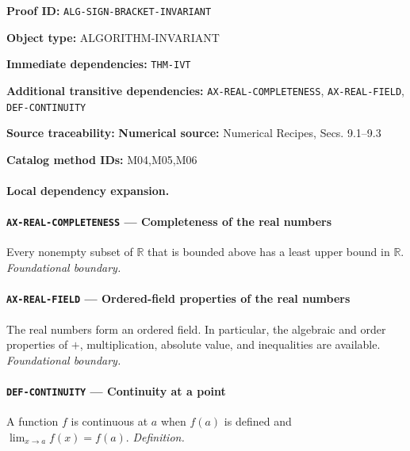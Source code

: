 \documentclass[10pt]{article}
\newcommand{\pidraw}[1]{\begingroup\urlstyle{tt}\nolinkurl{#1}\endgroup}
\theoremstyle{definition}
\theoremstyle{remark}
\newcommand{\meta}[2]{\noindent\textbf{#1:} #2\par}
\begin{document}
\meta{Proof ID}{\pidraw{ALG-SIGN-BRACKET-INVARIANT}}
\meta{Object type}{ALGORITHM-INVARIANT}
\meta{Immediate dependencies}{\pidraw{THM-IVT}}
\meta{Additional transitive dependencies}{\pidraw{AX-REAL-COMPLETENESS}, \pidraw{AX-REAL-FIELD}, \pidraw{DEF-CONTINUITY}}
\meta{Source traceability}{\textbf{Numerical source:} Numerical Recipes, Secs. 9.1--9.3}
\meta{Catalog method IDs}{M04,M05,M06}

\paragraph{Local dependency expansion.}

\paragraph{\pidraw{AX-REAL-COMPLETENESS} --- Completeness of the real numbers}
Every nonempty subset of $\mathbb{R}$ that is bounded above has a least upper bound in $\mathbb{R}$.
\textit{Foundational boundary.}

\paragraph{\pidraw{AX-REAL-FIELD} --- Ordered-field properties of the real numbers}
The real numbers form an ordered field. In particular, the algebraic and order properties of $+$, multiplication, absolute value, and inequalities are available.
\textit{Foundational boundary.}

\paragraph{\pidraw{DEF-CONTINUITY} --- Continuity at a point}
A function $f$ is continuous at $a$ when $f(a)$ is defined and $\lim_{x\to a}f(x)=f(a)$.
\textit{Definition.}
\end{document}
